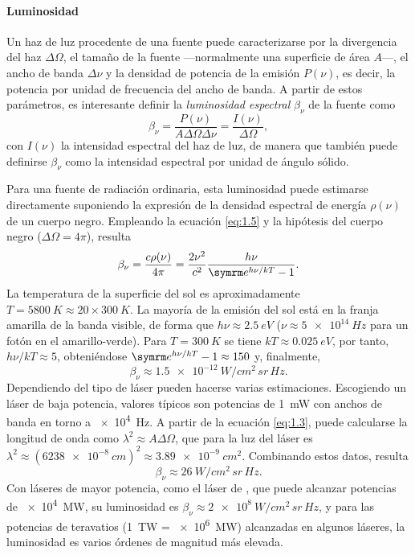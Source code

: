 \paragraph{Luminosidad}\label{par:1.1.2.4}
Un haz de luz procedente de una fuente puede caracterizarse por la divergencia del haz $\Delta\Omega$, el tamaño de la fuente ---normalmente una superficie de área $A$---, el ancho de banda $\Delta\nu$ y la densidad de potencia de la emisión $P(\nu)$, es decir, la potencia por unidad de frecuencia del ancho de banda\autocite{milonniLasers1988}. A partir de estos parámetros, es interesante definir la \emph{luminosidad espectral} $\beta_{\nu}$ de la fuente como 
\begin{equation}\label{eq:1.5}
    \beta_{\nu} = \frac{P(\nu)}{A\Delta\Omega\Delta\nu} = \frac{I(\nu)}{\Delta\Omega},
\end{equation}
con $I(\nu)$ la intensidad espectral del haz de luz, de manera que también puede definirse $\beta_{\nu}$ como la intensidad espectral por unidad de ángulo sólido.

Para una fuente de radiación ordinaria, esta luminosidad puede estimarse directamente suponiendo la expresión de la densidad espectral de energía $\rho(\nu)$ de un cuerpo negro. Empleando la ecuación \eqref{eq:1.5} y la hipótesis del cuerpo negro ($\Delta\Omega=4 \pi$), resulta
\begin{equation}\label{eq:1.6}
    \beta_{\nu} = \frac{c \rho(\nu)}{4 \pi} = \frac{2 \nu^{2}}{c^{2}}\frac{h \nu}{\eu^{h \nu/kT}-1}.
\end{equation}
La temperatura de la superficie del sol es aproximadamente $T = \qty{5800}{K} \approx 20 \times \qty{300}{K}$. La mayoría de la emisión del sol está en la franja amarilla de la banda visible, de forma que $h\nu \approx \qty{2,5}{eV}$ ($\nu \approx \qty{5e14}{Hz}$ para un fotón en el amarillo-verde). Para $T = \qty{300}{K}$ se tiene $kT \approx \qty{0,025}{eV}$, por tanto, $h \nu/kT \approx 5$, obteniéndose $\eu^{h \nu/kT}-1 \approx 150$ y, finalmente,
\begin{equation}\label{eq:1.7}
    \beta_{\nu} \approx \qty{1,5e-12}{W/cm^{2}\,sr\,Hz}.
\end{equation}
Dependiendo del tipo de láser pueden hacerse varias estimaciones. Escogiendo un láser  de baja potencia, valores típicos\autocite{milonniLasers1988} son potencias de \qty{1}{mW} con anchos de banda en torno a \qty{e4}{Hz}. A partir de la ecuación \eqref{eq:1.3}, puede calcularse la longitud de onda como $\lambda^{2} \approx A\Delta\Omega$, que para la luz del láser  es $\lambda^{2} \approx (\qty{6238e-8}{cm})^{2} \approx \qty{3,89e-9}{cm^{2}}$. Combinando estos datos, resulta 
\begin{equation}\label{eq:1.8}
    \beta_{\nu} \approx \qty{26}{W/cm^{2}\,sr\,Hz}.
\end{equation}
Con láseres de mayor potencia, como el láser de , que puede alcanzar potencias de \qty{e4}{MW}, su luminosidad es $\beta_{\nu} \approx \qty{2e8}{W/cm^{2}\,sr\,Hz}$, y para las potencias de teravatios (\qty{1}{TW} = \qty{e6}{MW}) alcanzadas en algunos láseres, la luminosidad es varios órdenes de magnitud más elevada.

